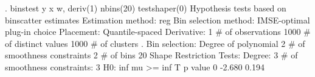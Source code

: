 . binstest y x w, deriv(1) nbins(20) testshaper(0)
{\smallskip}
Hypothesis tests based on binscatter estimates
Estimation method: reg
Bin selection method: IMSE-optimal plug-in choice
Placement: Quantile-spaced
Derivative: 1
{\smallskip}
\# of observations             {\VBAR}    1000
\# of distinct values          {\VBAR}    1000
\# of clusters                 {\VBAR}       .
Bin selection:                {\VBAR} 
         Degree of polynomial {\VBAR}       2
  \# of smoothness constraints {\VBAR}       2
                    \# of bins {\VBAR}      20
{\smallskip}
Shape Restriction Tests:
Degree: 3     \# of smoothness constraints: 3
{\smallskip}
H0: inf mu >=      {\VBAR} inf T             p value
         0         {\VBAR}  -2.680             0.194
